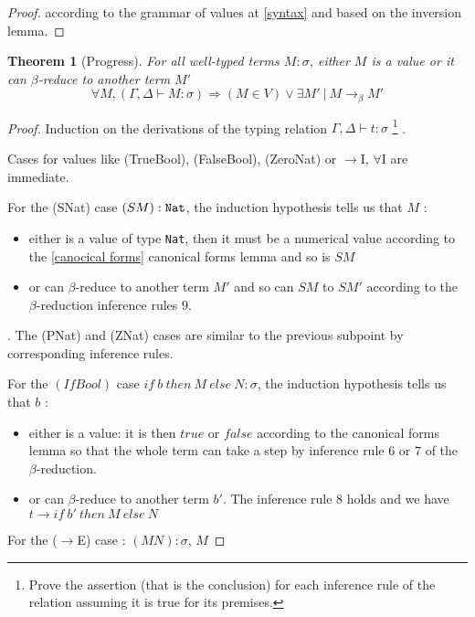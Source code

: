 \documentclass{article}
\newtheorem{theorem}{Theorem}[section]
\begin{document}
    \begin{proof}
        according to the grammar of values at \ref{syntax} and based on the inversion lemma.
    \end{proof}
        
    \begin{theorem}[Progress]
    \label{Progress}
    For all well-typed terms $M:\sigma$, either $M$ is a value or it can $\beta$-reduce to another term $M'$
    $$\forall M, (\Gamma,\Delta\vdash M:\sigma)\Rightarrow (M \in V) \vee \exists M' \ | \  M\rightarrow_\beta M'$$
    \end{theorem}
    \begin{proof}
        Induction on the derivations of the typing relation $\Gamma,\Delta\vdash t:\sigma$
        \footnote{Prove the assertion (that is the conclusion) for each inference rule of the relation assuming it is true for its premises. }
        .\par
        Cases for values like (TrueBool), (FalseBool), (ZeroNat) or $\rightarrow$I, $\forall$I are immediate.\par
        For the (SNat) case $(S M) : \verb|Nat|$, the induction hypothesis tells us that $M$ :
        \begin{itemize}
            \item either is a value of type \texttt{Nat}, then it must be a numerical value according to the 
            \ref{canocical forms} canonical forms lemma and so is $S M$
            \item or can $\beta$-reduce to another term $M'$ and so can $S M$ to $S M'$ according to the $\beta$-reduction inference rules $9$.
        \end{itemize}.
        The (PNat) and (ZNat) cases are similar to the previous subpoint by corresponding inference rules.
        \par
        For the $(IfBool)$ case $if \ b \ then \ M \ else \ N : \sigma$, the induction hypothesis tells us that $b$ :
        \begin{itemize}
            \item either is a value: it is then $true$ or $false$ according to the canonical forms lemma so that the whole term can take a step by inference rule $6$ or $7$ of the $\beta$-reduction.
            \item or can $\beta$-reduce to another term $b'$. The inference rule $8$ holds and we have $t\rightarrow if \ b' \ then \ M \ else \ N$
        \end{itemize}
        \par For the ($\rightarrow$E) case : $(M N):\sigma$, $M$

\end{proof}
\end{document}
